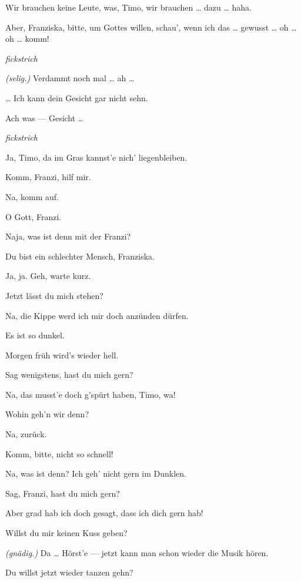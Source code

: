 \documentclass[
	final,
	a4paper,
	ngerman,
	mpinclude = true, %
	twoside = true,
	open = right,
	cleardoublepage = plain,
	DIV = 13,
	BCOR = 1cm,
	titlepage = firstiscover,
	]{scrbook}
\newcommand{\direction}[1]{\textit{(#1)}}
\newcommand{\hiat}{%
	\begin{center}
		\tiny
		\raisebox{0.5ex}{\rule{0.3\linewidth}{0.4pt}}
		\textit{fickstrich}
		\raisebox{0.5ex}{\rule{0.3\linewidth}{0.4pt}}
	\end{center}
}
\newcommand{\thecharacter}[1]{\textup{\textsc{#1}}\xspace}
\newcommand{\thesoldatin}{\thecharacter{Franziska}}
\newcommand{\thepraktikant}{\thecharacter{Timo}}
\newcommand{\character}[1]{\item[#1:]}
\newcommand{\soldatin}{\character{\thesoldatin}}
\newcommand{\praktikant}{\character{\thepraktikant}}
\begin{document}
\begin{play}
	\soldatin
	Wir brauchen keine Leute, was, Timo, wir brauchen \ldots{} dazu \ldots{} haha.

	\praktikant
	Aber, Franziska, bitte, um Gottes willen, schau', wenn ich das \ldots{} gewusst \ldots{} oh \ldots{} oh \ldots{} komm!

	\hiat

	\soldatin
	\direction{selig.} Verdammt noch mal \ldots{} ah \ldots{}

	\praktikant
	\ldots{} Ich kann dein Gesicht gar nicht sehn.

	\soldatin
	Ach was --- Gesicht \ldots{}

	\hiat

	\soldatin
	Ja, Timo, da im Gras kannst'e nich' liegenbleiben.

	\praktikant
	Komm, Franzi, hilf mir.

	\soldatin
	Na, komm auf.

	\praktikant
	O Gott, Franzi.

	\soldatin
	Naja, was ist denn mit der Franzi?

	\praktikant
	Du bist ein schlechter Mensch, Franziska.

	\soldatin
	Ja, ja. Geh, warte kurz.

	\praktikant
	Jetzt lässt du mich stehen?

	\soldatin
	Na, die Kippe werd ich mir doch anzünden dürfen.

	\praktikant
	Es ist so dunkel.

	\soldatin
	Morgen früh wird's wieder hell.

	\praktikant
	Sag wenigstens, hast du mich gern?

	\soldatin
	Na, das musst'e doch g'spürt haben, Timo, wa!

	\praktikant
	Wohin geh'n wir denn?

	\soldatin
	Na, zurück.

	\praktikant
	Komm, bitte, nicht so schnell!

	\soldatin
	Na, was ist denn? Ich geh' nicht gern im Dunklen.

	\praktikant
	Sag, Franzi, hast du mich gern?

	\soldatin
	Aber grad hab ich doch gesagt, dass ich dich gern hab!

	\praktikant
	Willst du mir keinen Kuss geben?

	\soldatin
	\direction{gnädig.} Da \ldots{} Hörst'e --- jetzt kann man schon wieder die Musik hören.

	\praktikant
	Du willst jetzt wieder tanzen gehn?


\end{play}
\end{document}
